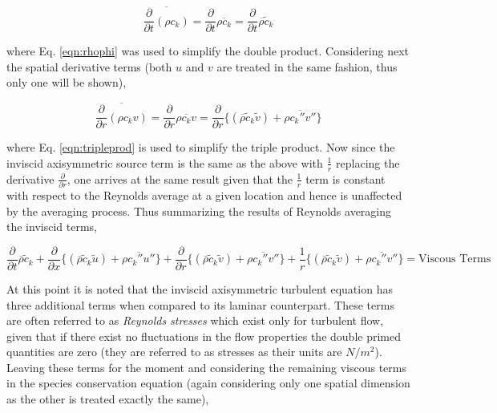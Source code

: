 \begin{displaymath}
	\overline{\frac{\partial}{\partial t}(\rho c_k)} = \frac{\partial}{\partial t}\overline{\rho c_k} = 
	\frac{\partial}{\partial t}\overline{\rho}\tilde c_k
\end{displaymath}

	where Eq. \ref{eqn:rhophi} was used to simplify the double product.  Considering next the spatial derivative
terms (both $u$ and $v$ are treated in the same fashion, thus only one will be shown),

\begin{displaymath}
	\overline{\frac{\partial}{\partial r}(\rho c_k v)} = \frac{\partial}{\partial r}\overline{\rho c_k v} = 
	\frac{\partial}{\partial r}\Big\{(\overline{\rho}\tilde c_k\tilde{v}) + \overline{\rho c_k'' v''}\Big\}
\end{displaymath}

	where Eq. \ref{eqn:tripleprod} is used to simplify the triple product.  Now since the inviscid axisymmetric 
source term is the same as the above with $\frac {1}{r}$ replacing the derivative $\frac{\partial}{\partial r}$,
one arrives at the same result given that the $\frac{1}{r}$ term is constant with respect to the
Reynolds average at a given location and hence is unaffected by the averaging process.  Thus summarizing the 
results of Reynolds averaging the inviscid terms,

\begin{displaymath}
	\frac{\partial}{\partial t}\overline{\rho}\tilde c_k + \frac{\partial}{\partial x}\Big\{
	(\overline{\rho}\tilde c_k\tilde{u}) + \overline{\rho c_k'' u''}\Big\} + \frac{\partial}{\partial r}\Big\{
	(\overline{\rho}\tilde c_k\tilde{v}) + \overline{\rho c_k'' v''}\Big\}	+ \frac{1}{r}\Big\{
	(\overline{\rho}\tilde c_k\tilde{v}) + \overline{\rho c_k'' v''}\Big\} = \textrm{Viscous Terms}
\end{displaymath}

	At this point it is noted that the inviscid axisymmetric turbulent equation has three additional terms when
compared to its laminar counterpart.  These terms are often referred to as \emph{Reynolds stresses} which exist only
for turbulent flow, given that if there exist no fluctuations in the flow properties the double primed quantities are
zero (they are referred to as stresses as their units are $N/m^2$).  Leaving these terms for the moment and considering 
the remaining viscous terms in the species conservation equation (again considering only one spatial dimension as the 
other is treated exactly the same),

